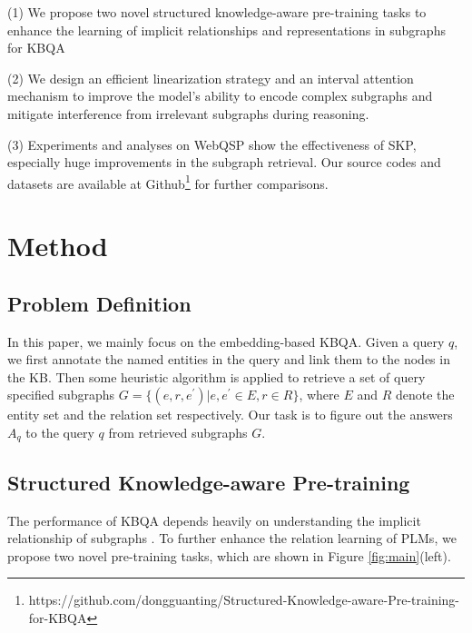 \documentclass[sigconf,natbib=true,anonymous=False]{acmart}
\begin{document}
(1) We propose two novel structured knowledge-aware pre-training tasks to enhance the learning of implicit relationships and representations in subgraphs for KBQA

(2) We design an efficient linearization strategy and an interval attention mechanism to improve the model's ability to encode complex subgraphs and mitigate interference from irrelevant subgraphs during reasoning.

(3) Experiments and analyses on WebQSP show the effectiveness of SKP, especially huge improvements in the subgraph retrieval. Our source codes and datasets are available at Github\footnote{https://github.com/dongguanting/Structured-Knowledge-aware-Pre-training-for-KBQA} for further comparisons.









\section{Method}
\subsection{Problem Definition}
In this paper, we mainly focus on the embedding-based KBQA. Given a query $q$, we first annotate the named entities in the query and link them to the nodes in the KB. Then some heuristic algorithm is applied to retrieve a set of query specified subgraphs $G = \{(e, r, e^{'}) |e, e^{'} \in E, r \in R\}$, where $E$ and $R$ denote the entity set and the relation set respectively. Our task is to figure out the answers $A_q$ to the query $q$ from retrieved subgraphs $G$. 

\subsection{Structured Knowledge-aware Pre-training}
The performance of KBQA depends heavily on understanding the implicit relationship of subgraphs . To further enhance the relation learning of PLMs, we propose two novel pre-training tasks, which are shown in Figure \ref{fig:main}(left).
\end{document}

